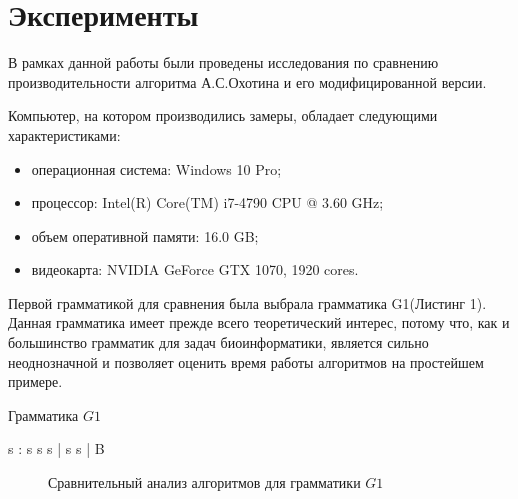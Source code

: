 \documentclass[14pt]{matmex-diploma}
\begin{document}
\section{Эксперименты}

В рамках данной работы были проведены исследования по сравнению производительности алгоритма А.С.Охотина и его модифицированной версии.

Компьютер, на котором производились замеры, обладает следующими характеристиками:
\begin{itemize}
    \item операционная система: Windows 10 Pro;
    \item процессор: Intel(R) Core(TM) i7-4790 CPU @ 3.60 GHz;
    \item объем оперативной памяти: 16.0 GB;
    \item видеокарта: NVIDIA GeForce GTX 1070, 1920 cores.
\end{itemize}


Первой грамматикой для сравнения была выбрала грамматика G1\linebreak(Листинг 1). Данная грамматика имеет прежде всего теоретический интерес, потому что, как и большинство грамматик для задач биоинформатики, является сильно неоднозначной и позволяет оценить время работы алгоритмов на простейшем примере.

\begin{listing}
\caption{Грамматика $G1$}
\begin{pyglist}[]
                   s :  s s s  |  s s  |  B 
\end{pyglist}
\end{listing} 


\begin{figure}[h]
\centering
{}
\caption{Сравнительный анализ алгоритмов для грамматики $G1$}
\end{figure}
\end{document}
